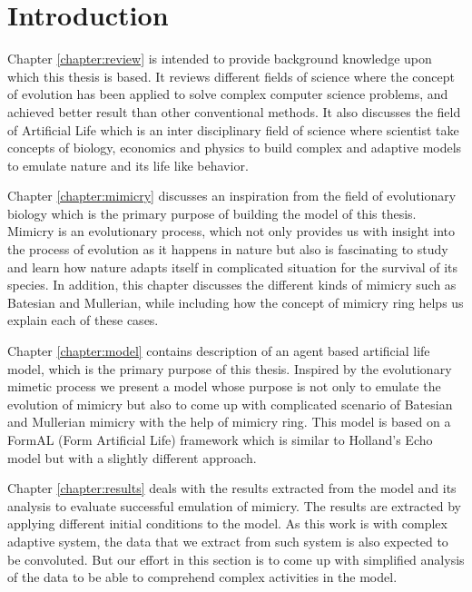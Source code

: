 \chapter{Introduction}
\label{chapter:introduction}


Chapter \ref{chapter:review} is intended to provide background knowledge upon which this thesis is based. It reviews different fields of science where the concept of evolution has been applied to solve complex computer science problems, and achieved better result than other conventional methods. It also discusses the field of Artificial Life which is an inter disciplinary field of science where scientist take concepts of biology, economics and physics to build complex and adaptive models to emulate nature and its life like behavior.

Chapter \ref{chapter:mimicry} discusses an inspiration from the field of evolutionary biology which is the primary purpose of building the model of this thesis. Mimicry is an evolutionary process, which not only provides us with insight into the process of evolution as it happens in nature but also is fascinating to study and learn how nature adapts itself in complicated situation for the survival of its species. In addition, this chapter discusses the different kinds of mimicry such as Batesian and Mullerian, while including how the concept of mimicry ring helps us explain each of these cases. 

Chapter \ref{chapter:model} contains description of an agent based artificial life model, which is the primary purpose of this thesis. Inspired by the evolutionary mimetic process we present a model whose purpose is not only to emulate the evolution of mimicry but also to come up with complicated scenario of Batesian and Mullerian mimicry with the help of mimicry ring. This model is based on a FormAL (Form Artificial Life) framework which is similar to Holland's Echo model but with a slightly different approach. 

Chapter \ref{chapter:results} deals with the results extracted from the model and its analysis to evaluate successful emulation of mimicry. The results are extracted by applying different initial conditions to the model. As this work is with complex adaptive system, the data that we extract from such system is also expected to be convoluted. But our effort in this section is to come up with simplified analysis of the data to be able to comprehend complex activities in the model. 

